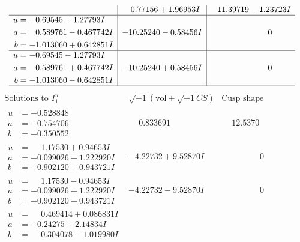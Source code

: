 \documentclass[1p]{elsarticle_modified}
\theoremstyle{definition}
\newcommand{\I}{\sqrt{-1}}
\begin{document}
$$\begin{array}{c|c|c}
 & \phantom{-}0.77156 + 1.96953 I & \phantom{-}11.39719 - 1.23723 I \\ \hline\begin{aligned}
u &= -0.69545 + 1.27793 I \\
a &= \phantom{-}0.589761 - 0.467742 I \\
b &= -1.013060 + 0.642851 I\end{aligned}
 & -10.25240 - 0.58456 I & \phantom{-0.000000 } 0 \\ \hline\begin{aligned}
u &= -0.69545 - 1.27793 I \\
a &= \phantom{-}0.589761 + 0.467742 I \\
b &= -1.013060 - 0.642851 I\end{aligned}
 & -10.25240 + 0.58456 I & \phantom{-0.000000 } 0\\
 \hline 
 \end{array}$$\newpage$$\begin{array}{c|c|c}  
\text{Solutions to }I^u_{1}& \I (\text{vol} + \sqrt{-1}CS) & \text{Cusp shape}\\
 \hline 
\begin{aligned}
u &= -0.528848\phantom{ +0.000000I} \\
a &= -0.754706\phantom{ +0.000000I} \\
b &= -0.350552\phantom{ +0.000000I}\end{aligned}
 & \phantom{-}0.833691\phantom{ +0.000000I} & \phantom{-}12.5370\phantom{ +0.000000I} \\ \hline\begin{aligned}
u &= \phantom{-}1.17530 + 0.94653 I \\
a &= -0.099026 - 1.222920 I \\
b &= -0.902120 + 0.943721 I\end{aligned}
 & -4.22732 + 9.52870 I & \phantom{-0.000000 } 0 \\ \hline\begin{aligned}
u &= \phantom{-}1.17530 - 0.94653 I \\
a &= -0.099026 + 1.222920 I \\
b &= -0.902120 - 0.943721 I\end{aligned}
 & -4.22732 - 9.52870 I & \phantom{-0.000000 } 0 \\ \hline\begin{aligned}
u &= \phantom{-}0.469414 + 0.086831 I \\
a &= -0.24275 + 2.14834 I \\
b &= \phantom{-}0.304078 - 1.019980 I\end{aligned}

\end{array}$$
\end{document}
